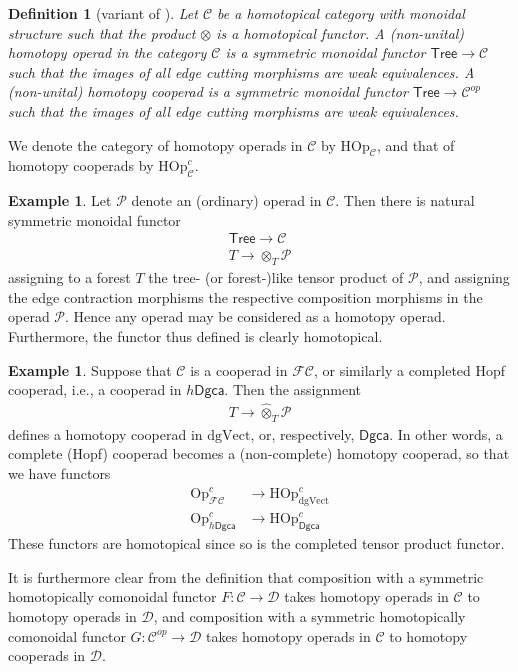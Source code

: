 \documentclass[a4paper]{amsart}
\theoremstyle{plain}
\newtheorem{defi}[thm]{Definition}
\theoremstyle{definition}
\newtheorem{ex}[thm]{Example}
\newcommand{\op}{\mathcal}
\newcommand{\dgca}{\mathsf{Dgca}}
\newcommand{\mC}{{\mathcal{C}}}
\newcommand{\mD}{{\mathcal{D}}}
\newcommand{\Hop}{{\mathrm{HOp}}}
\newcommand{\Op}{{\mathrm{Op}}}
\newcommand{\Tree}{{\mathsf{Tree}}}
\newcommand{\dgVect}{\mathrm{dgVect}}
\newcommand{\FC}{\mathcal{FC}}
\newcommand{\hdgca}{h\dgca}
\begin{document}
\begin{defi}[variant of \cite{LV}]
Let $\mC$ be a homotopical category with monoidal structure such that the product $\otimes$ is a homotopical functor.
A (non-unital) homotopy operad in the category $\mC$ is a symmetric monoidal functor $\Tree\to \mC$ such that the images of all edge cutting morphisms are weak equivalences.
A (non-unital) homotopy cooperad is a symmetric monoidal functor $\Tree\to \mC^{op}$ such that the images of all edge cutting morphisms are weak equivalences.
\end{defi}

We denote the category of homotopy operads in $\mC$ by $\Hop_\mC$, and that of homotopy cooperads by $\Hop_\mC^c$.

\begin{ex}\label{ex:op is hop}
Let $\op P$ denote an (ordinary) operad in $\mC$. Then there is natural symmetric monoidal functor 
\begin{align*}
\Tree \to \mC \\
T\to \otimes_T \op P
\end{align*}
assigning to a forest $T$ the tree- (or forest-)like tensor product of $\op P$, and assigning the edge contraction morphisms the respective composition morphisms in the operad $\op P$.
Hence any operad may be considered as a homotopy operad.
Furthermore, the functor thus defined is clearly homotopical.
\end{ex}

\begin{ex}\label{ex:cop is hop}
Suppose that $\op C$ is a cooperad in $\FC$, or similarly a completed Hopf cooperad, i.e., a cooperad in $\hdgca$.
Then the assignment
\begin{align*}
T\to \hat \otimes_T \op P
\end{align*}
defines a homotopy cooperad in $\dgVect$, or, respectively, $\dgca$. In other words, a complete (Hopf) cooperad becomes a (non-complete) homotopy cooperad, so that we have functors
\begin{align*}
\Op_{\FC}^c &\to \Hop^c_{\dgVect} \\
\Op_{\hdgca}^c &\to \Hop^c_{\dgca} 
\end{align*}
These functors are homotopical since so is the completed tensor product functor.
\end{ex}

It is furthermore clear from the definition that composition with a symmetric homotopically comonoidal functor $F:\mC\to \mD$ takes homotopy operads in $\mC$ to homotopy operads in $\mD$, and composition with a symmetric homotopically comonoidal functor $G:\mC^{op}\to \mD$ takes homotopy operads in $\mC$ to homotopy cooperads in $\mD$.
\end{document}
